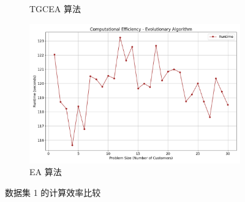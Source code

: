 \documentclass[12pt,a4paper,oneside]{ctexart}
\begin{document}
\begin{appendices}
\begin{figure}[h!]
\begin{subfigure}{0.32\textwidth}
			\caption{TGCEA 算法}
		\end{subfigure}
		\begin{subfigure}{0.32\textwidth}
			\includegraphics[width=\textwidth]{fig/18.png}
			\caption{EA 算法}
		\end{subfigure}
		\caption{数据集 1 的计算效率比较}
		\label{fig:dataset1_efficiency}
	\end{figure}
	

\end{appendices}
\end{document}
